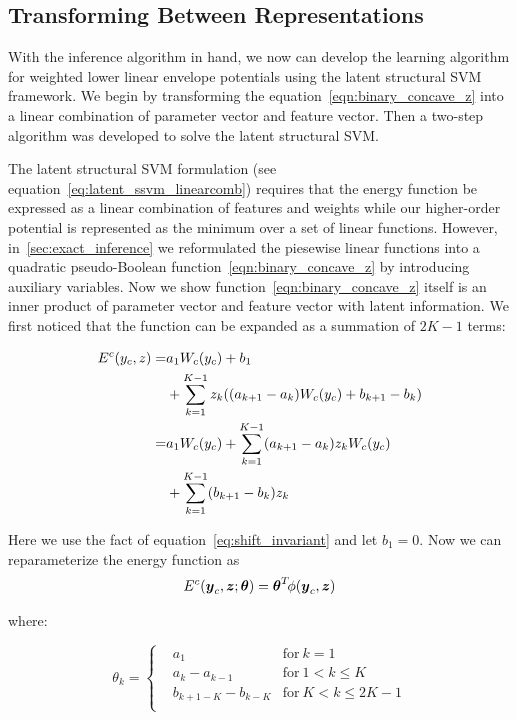 \documentclass[sigconf, anonymous, review]{acmart}
\begin{document}

\subsection{Transforming Between Representations}
\label{sec:learning}
With the inference algorithm in hand, we now can develop the
learning algorithm for weighted lower linear envelope potentials
using the latent structural SVM framework. We begin by
transforming the equation~\eqref{eqn:binary_concave_z} into a
linear combination of parameter vector and feature vector. Then a
two-step algorithm was developed to solve the latent structural
SVM.

The latent structural SVM formulation (see
equation~\eqref{eq:latent_ssvm_linearcomb}) requires that the
energy function be expressed as a linear combination of features
and weights while our higher-order potential is represented as
the minimum over a set of linear functions. However,
in~\ref{sec:exact_inference} we reformulated the piesewise linear
functions into a quadratic pseudo-Boolean
function~\eqref{eqn:binary_concave_z} by introducing auxiliary
variables. Now we show function~\eqref{eqn:binary_concave_z}
itself is an inner product of parameter vector and feature vector
with latent information. We first noticed that the function can
be expanded as a summation of $2K-1$ terms:

\begin{align}
  \label{eq:originalenergy}
  E^c(y_c,z)=&a_1W_c(y_c)+b_1\notag \\
            &+\sum_{k=1}^{K-1}z_k((a_{k+1}-a_k)W_c(y_c)+b_{k+1}-b_k)\notag \\ 
            =&a_1W_c(y_c)+\sum_{k=1}^{K-1}(a_{k+1}-a_k)z_kW_c(y_c) \notag \\
            &+\sum_{k=1}^{K-1}(b_{k+1}-b_k)z_k
\end{align}

Here we use the fact of equation~\eqref{eq:shift_invariant} and
let $b_1=0$. Now we can reparameterize the energy function
as
\begin{align}
  \label{eq:llsvm_innerprod_energy}
  E^c({\boldsymbol{y}}_c,{\boldsymbol{z}}; \boldsymbol{\theta}) = \boldsymbol{\theta}^T \! \phi({\boldsymbol{y}}_c,{\boldsymbol{z}})
\end{align}

\noindent where:

\begin{equation}
\label{eq:llsvm_param}
  \theta_k = \left\{
    \begin{aligned}
      & a_1	& \text{for} \ k=1\\
      & a_k-a_{k-1} & \text{for}\ 1< k \leq K\\
      & b_{k+1-K}-b_{k-K} & \text{for} \ K<k\le2K-1\\
    \end{aligned}
  \right.
\end{equation}
\end{document}
